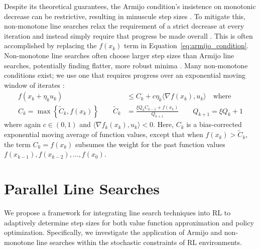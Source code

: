 \documentclass[10pt]{article} %
\newcommand{\tocite}[1]{{\color{Maroon} (cite: #1)}}
\newcommand{\xAt}[1]{x_{#1}}
\newcommand{\update}{u}
\newcommand{\updateAt}[1]{\update_{#1}}
\newcommand{\stepSize}{\eta}
\newcommand{\stepSizeAt}[1]{\stepSize_{#1}}
\newcommand{\inner}[2]{\langle #1, #2 \rangle}
\begin{document}
Despite its theoretical guarantees, the Armijo condition's insistence on monotonic decrease can be restrictive, resulting in minuscule step sizes \citep{nocedal2006numerical}.
To mitigate this, non-monotone line searches relax the
requirement of a strict decrease at every iteration and instead simply require that progress be made overall
\citep{zhang2004nonmonotone,galli2023monotone,fox2024nonmonotone,grippo1986nonmonotone,dai2002nonmonotone,huynh1993nonmonotone,ernesto2000nonmonotone}. This is often accomplished by replacing the $f(\xAt{k})$ term in
Equation~\ref{eq:armijo_condition}. Non-monotone line searches often choose larger step sizes than Armijo line searches, potentially finding flatter, more robust minima \citep{fox2024nonmonotone}.
Many non-monotone conditions exist; we use one that requires progress over an exponential moving window of iterates \citep{zhang2004nonmonotone,galli2023monotone}:
%
\begin{equation}
	\begin{split}
		f(\xAt{k} + \stepSizeAt{k} \updateAt{k}) &\le C_k + c \stepSizeAt{k} \inner{\nabla f(\xAt{k})}{\updateAt{k}} 
		\quad \text{where} \\
			C_k = \max \left\{ \tilde C_k, f(x_k) \right\} \qquad
			\tilde C_k &= \frac{\xi Q_k C_{k-1} + f(x_k)}{Q_{k+1}} \qquad 
			Q_{k + 1} = \xi Q_k + 1
	\end{split}
	\label{eq:nonmonotone_condition}
\end{equation}
%
where again $c \in (0, 1)$ and $\inner{\nabla f_k(\xAt{k})}{\updateAt{k}} < 0$. Here, $C_k$ is a bias-corrected exponential moving average of function values, except that
when $f(\xAt{k}) > \tilde C_k$, the term $C_k = f(\xAt{k})$ subsumes the weight for the past function values $f(\xAt{k -
1}), f(\xAt{k - 2}), \ldots, f(\xAt{0})$.


\section{Parallel Line Searches}

We propose a framework for integrating line search techniques into RL to adaptively determine step sizes for both value function approximation and policy optimization. Specifically, we investigate the application of Armijo \citep{armijo1966minimization} and non-monotone \citep{zhang2004nonmonotone} line searches within the stochastic constraints of RL environments.
\end{document}
